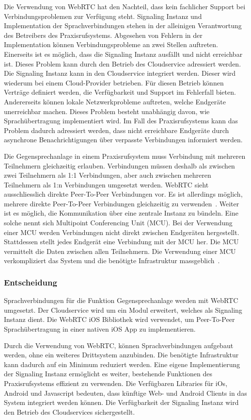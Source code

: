 Die Verwendung von WebRTC hat den Nachteil, dass kein fachlicher Support bei Verbindungsproblemen zur Verfügung steht.
Signaling Instanz und Implementation der Sprachverbindungen stehen in der alleinigen Verantwortung des Betreibers des Praxisrufsystems.
Abgesehen von Fehlern in der Implementation können Verbindungsprobleme an zwei Stellen auftreten.
Einerseits ist es möglich, dass die Signaling Instanz ausfällt und nicht erreichbar ist.
Dieses Problem kann durch den Betrieb des Cloudservice adressiert werden.
Die Signaling Instanz kann in den Cloudservice integriert werden.
Dieser wird wiederum bei einem Cloud-Provider betrieben.
Für diesen Betrieb können Verträge definiert werden, die Verfügbarkeit und Support im Fehlerfall bieten.
Andererseits können lokale Netzwerkprobleme auftreten, welche Endgeräte unerreichbar machen.
Dieses Problem besteht unabhängig davon, wie Sprachübertragung implementiert wird.
Im Fall des Praxisrufsystems kann das Problem dadurch adressiert werden, dass nicht erreichbare Endgeräte durch asynchrone Benachrichtigungen über verpasste Verbindungen informiert werden.

Die Gegensprechanlage in einem Praxisrufsystem muss Verbindung mit mehreren Teilnehmern gleichzeitig erlauben.
Verbindungen müssen deshalb als zwischen zwei Teilnehmern als 1:1 Verbindungen, aber auch zwischen mehreren Teilnehmern als 1:n Verbindungen umgesetzt werden.
WebRTC sieht ausschliesslich direkte Peer-To-Peer Verbindungen vor.
Es ist allerdings möglich, mehrere direkte Peer-To-Peer Verbindungen gleichzeitig zu verwenden~\cite{webrtc_mesh}.
Weiter ist es möglich, die Kommunikation über eine zentrale Instanz zu bündeln.
Eine solche nennt sich Multipoint Conferencing Unit (MCU).
Bei der Verwendung einer MCU werden Verbindungen nicht direkt zwischen Endgeräten hergestellt.
Stattdessen stellt jedes Endgerät eine Verbindung mit der MCU her.
Die MCU vermittelt die Daten zwischen allen Teilnehmern.
Die Verwendung einer MCU verkompliziert das System und die benötigte Infrastruktur massgeblich~\cite{webrtc_mcu}.

\subsubsection{Entscheidung}

Sprachverbindungen für die Funktion Gegensprechanlage werden mit WebRTC umgesetzt.
Der Cloudservice wird um ein Modul erweitert, welches als Signaling Instanz dient.
Die WebRTC iOS Bibliothek wird verwendet, um Peer-To-Peer Sprachübertragung in einer nativen iOS App zu implementieren.

Durch die Verwendung von WebRTC, können Sprachverbindungen aufgebaut werden, ohne ein weiteres Drittsystem anzubinden.
Die benötigte Infrastruktur kann dadurch auf ein Minimum reduziert werden.
Eine eigene Implementierung der Signaling Instanz ermöglicht es weiter, bestehende Funktionen des Praxisrufsystems effizient zu verwenden.
Die Verfügbaren Libraries für iOs, Android und Javascript bedeuten, dass künftige Web- und Android Clients in das System integriert werden können.
Die Verfügbarkeit der Signaling Instanz wird den Betrieb des Cloudservices sichergestellt.

\clearpage
